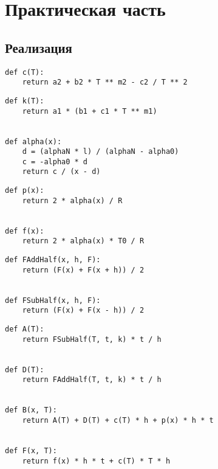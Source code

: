 \chapter{Практическая часть}

\section{Реализация}
\begin{lstlisting}[caption={Теплоёмкость стержня}]
def c(T):
    return a2 + b2 * T ** m2 - c2 / T ** 2
\end{lstlisting}

\begin{lstlisting}[caption={Коэффициенты теплопроводности материала стержня и теплоотдачи при обдуве}]
def k(T):
    return a1 * (b1 + c1 * T ** m1)


def alpha(x):
    d = (alphaN * l) / (alphaN - alpha0)
    c = -alpha0 * d
    return c / (x - d)
\end{lstlisting}

\begin{lstlisting}[caption={Замены p и f}]
def p(x):
    return 2 * alpha(x) / R


def f(x):
    return 2 * alpha(x) * T0 / R
\end{lstlisting}

\begin{lstlisting}[caption={Метод средних}]
def FAddHalf(x, h, F):
    return (F(x) + F(x + h)) / 2


def FSubHalf(x, h, F):
    return (F(x) + F(x - h)) / 2
\end{lstlisting}

\begin{lstlisting}[caption={Параметры разностной схемы}]
def A(T):
    return FSubHalf(T, t, k) * t / h


def D(T):
    return FAddHalf(T, t, k) * t / h


def B(x, T):
    return A(T) + D(T) + c(T) * h + p(x) * h * t


def F(x, T):
    return f(x) * h * t + c(T) * T * h
\end{lstlisting}

